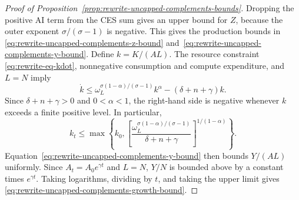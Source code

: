 \begin{proof}[Proof of Proposition~\ref{prop:rewrite-uncapped-complements-bounds}]
\label{proof:rewrite-uncapped-complements-bounds}
Dropping the positive AI term from the CES sum gives an upper bound for
$Z$, because the outer exponent $\sigma/(\sigma-1)$ is negative.
This gives the production bounds in
\eqref{eq:rewrite-uncapped-complements-z-bound}
and~\eqref{eq:rewrite-uncapped-complements-y-bound}.
Define $k=K/(AL)$. The resource constraint
\eqref{eq:rewrite-eq-kdot}, nonnegative consumption and compute expenditure,
and $L=N$ imply
\begin{equation}
 \dot k\leq
 \omega_L^{\sigma(1-\alpha)/(\sigma-1)}k^\alpha
 -(\delta+n+\gamma)k.
 \label{eq:rewrite-uncapped-complements-k-bound}
\end{equation}
Since $\delta+n+\gamma>0$ and $0<\alpha<1$, the right-hand side is
negative whenever $k$ exceeds a finite positive level. In particular,
\[
 k_t\leq
 \max\left\{k_0,
 \left[\frac{\omega_L^{\sigma(1-\alpha)/(\sigma-1)}}
 {\delta+n+\gamma}\right]^{1/(1-\alpha)}\right\}.
\]
Equation~\eqref{eq:rewrite-uncapped-complements-y-bound} then bounds
$Y/(AL)$ uniformly. Since $A_t=A_0e^{\gamma t}$ and $L=N$,
$Y/N$ is bounded above by a constant times $e^{\gamma t}$.
Taking logarithms, dividing by $t$, and taking the upper limit gives
\eqref{eq:rewrite-uncapped-complements-growth-bound}.
\end{proof}

